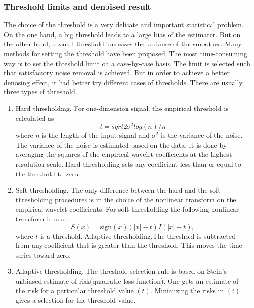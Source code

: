 \subsubsection{Threshold limits and denoised result}
The choice of the threshold is a
very delicate and important statistical problem.  On the one hand, a
big threshold leads to a large bias of the estimator. But on the other
hand, a small threshold increases the variance of the smoother.
Many methods for setting the threshold have been proposed. The most time-consuming
way is to set the threshold limit on a case-by-case basis. The limit
is selected such that satisfactory noise removal is achieved. But in
order to achieve a better denosing effect, it had better try different
cases of thresholds. There are usually three types of threshold. 
\begin{enumerate}[(1)]
    \item Hard thresholding. For one-dimension signal, the empirical
        threshold is calculated as 
        \begin{equation}
            t=sqrt{2\sigma^2 log(n)/n}
            \label{wavelethardthreshold}
        \end{equation}
        where $n$ is the length of the input signal and $\sigma^2$ is
        the variance of the noise. The variance of the noise is
        estimated based on the data. It is done by averaging the
        squares of the empirical wavelet coefficients at the highest
        resolution scale. Hard thresholding sets any coefficient less
        than or equal to the threshold to zero. 
    \item Soft thresholding. The only difference between the hard and
        the soft thresholding procedures is in the choice of the
        nonlinear transform on the empirical wavelet coefficients. For
        soft thresholding the following nonlinear transform is used: 
        \begin{equation}
            S(x)=\mathrm{sign}(x)(|x|-t)I(|x|-t),
            \label{waveletsoftthreshold}
        \end{equation}
        where $t$ is a threshold.  Adaptive thresholding.The threshold
        is subtracted from any coefficient that is greater than the
        threshold. This moves the time series toward zero. 
    \item Adaptive thresholding. The threshold selection rule is based on
        Stein's unbiased estimate of risk(quadratic loss function).
        One gets an estimate of the risk for a particular threshold
        value $(t)$. Minimizing the risks in $(t)$ gives a selection
        for the threshold value.
\end{enumerate}

